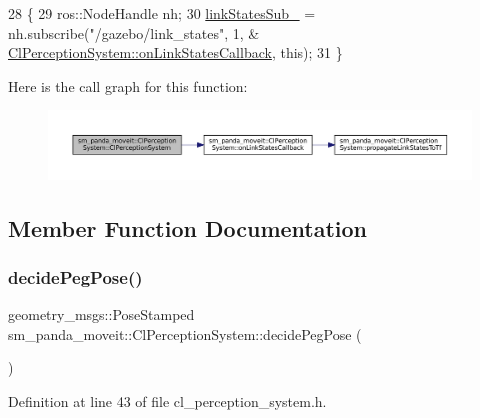 \begin{DoxyCode}
28     \{
29         ros::NodeHandle nh;
30         \hyperlink{classsm__panda__moveit_1_1ClPerceptionSystem_aebd5e06a7524fbdd05904156529ed816}{linkStatesSub\_} = nh.subscribe(\textcolor{stringliteral}{"/gazebo/link\_states"}, 1, &
      \hyperlink{classsm__panda__moveit_1_1ClPerceptionSystem_a017fd058419a7279487da03d180bb2d2}{ClPerceptionSystem::onLinkStatesCallback}, \textcolor{keyword}{this});
31     \}
\end{DoxyCode}
Here is the call graph for this function\+:
\nopagebreak
\begin{figure}[H]
\begin{center}
\leavevmode
\includegraphics[width=350pt]{classsm__panda__moveit_1_1ClPerceptionSystem_acbab40cf31fbcd8733a9a40821cb7b13_cgraph}
\end{center}
\end{figure}


\subsection{Member Function Documentation}
\mbox{\label{classsm__panda__moveit_1_1ClPerceptionSystem_af90368e6bddd4bda759f6b859c0b37e6}} 
\subsubsection{\texorpdfstring{decide\+Peg\+Pose()}{decidePegPose()}}
{\footnotesize\ttfamily geometry\+\_\+msgs\+::\+Pose\+Stamped sm\+\_\+panda\+\_\+moveit\+::\+Cl\+Perception\+System\+::decide\+Peg\+Pose (\begin{DoxyParamCaption}{ }\end{DoxyParamCaption})\hspace{0.3cm}{\ttfamily [inline]}}



Definition at line 43 of file cl\+\_\+perception\+\_\+system.\+h.



